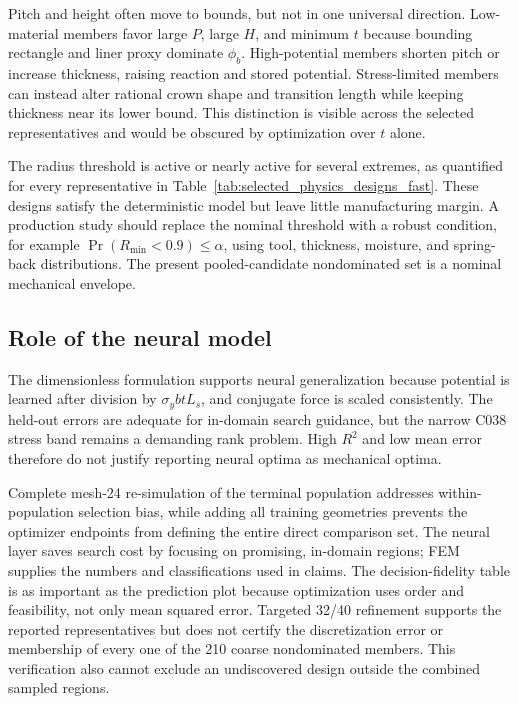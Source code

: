 \documentclass[11pt]{article}
\newcommand{\Rmin}{R_{\min}}
\newcommand{\phib}{\phi_{b}}
\begin{document}
Pitch and height often move to bounds, but not in one universal direction. Low-material members favor large $P$, large $H$, and minimum $t$ because bounding rectangle and liner proxy dominate $\phib$. High-potential members shorten pitch or increase thickness, raising reaction and stored potential. Stress-limited members can instead alter rational crown shape and transition length while keeping thickness near its lower bound. This distinction is visible across the selected representatives and would be obscured by optimization over $t$ alone.

The radius threshold is active or nearly active for several extremes, as quantified for every representative in Table~\ref{tab:selected_physics_designs_fast}. These designs satisfy the deterministic model but leave little manufacturing margin. A production study should replace the nominal threshold with a robust condition, for example $\Pr(\Rmin<0.9)\le\alpha$, using tool, thickness, moisture, and spring-back distributions. The present pooled-candidate nondominated set is a nominal mechanical envelope.

\subsection{Role of the neural model}

The dimensionless formulation supports neural generalization because potential is learned after division by $\sigma_ybtL_s$, and conjugate force is scaled consistently. The held-out errors are adequate for in-domain search guidance, but the narrow C038 stress band remains a demanding rank problem. High $R^2$ and low mean error therefore do not justify reporting neural optima as mechanical optima.

Complete mesh-24 re-simulation of the terminal population addresses within-population selection bias, while adding all training geometries prevents the optimizer endpoints from defining the entire direct comparison set. The neural layer saves search cost by focusing on promising, in-domain regions; FEM supplies the numbers and classifications used in claims. The decision-fidelity table is as important as the prediction plot because optimization uses order and feasibility, not only mean squared error. Targeted 32/40 refinement supports the reported representatives but does not certify the discretization error or membership of every one of the 210 coarse nondominated members. This verification also cannot exclude an undiscovered design outside the combined sampled regions.
\end{document}

